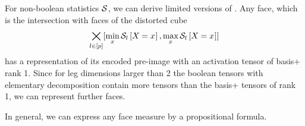\begin{remark}
    For non-boolean statistics $\mathcal{S}$, we can derive limited versions of .
    Any face, which is the intersection with faces of the distorted cube
    \begin{align*}
        \bigtimes_{l\in[p]} [\min_{x}\mathcal{S}_{l}\left[X_{}=x_{}\right],\max_{x}\mathcal{S}_{l}\left[X_{}=x_{}\right]]
    \end{align*}
    has a representation of its encoded pre-image with an activation tensor of basis+ rank 1.
    Since for leg dimensions larger than 2 the boolean tensors with elementary decomposition contain more tensors than the basis+ tensors of rank 1, we can represent further faces.
\end{remark}



%

In general, we can express any face measure by a propositional formula.

